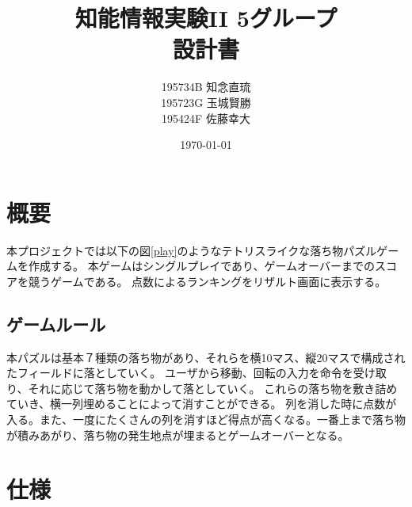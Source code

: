 \documentclass[a4paper,11pt]{jsarticle}
\begin{document}
\title{知能情報実験II 5グループ\\設計書}
\author{195734B 知念直琉\\195723G 玉城賢勝\\195424F 佐藤幸大}
\date{\today}
\maketitle
\section{概要}
本プロジェクトでは以下の図\ref{play}のようなテトリスライクな落ち物パズルゲームを作成する。
本ゲームはシングルプレイであり、ゲームオーバーまでのスコアを競うゲームである。
点数によるランキングをリザルト画面に表示する。
\subsection{ゲームルール}
本パズルは基本７種類の落ち物があり、それらを横10マス、縦20マスで構成されたフィールドに落としていく。
ユーザから移動、回転の入力を命令を受け取り、それに応じて落ち物を動かして落としていく。
これらの落ち物を敷き詰めていき、横一列埋めることによって消すことができる。
列を消した時に点数が入る。また、一度にたくさんの列を消すほど得点が高くなる。一番上まで落ち物が積みあがり、落ち物の発生地点が埋まるとゲームオーバーとなる。

\section{仕様}
\end{document}
